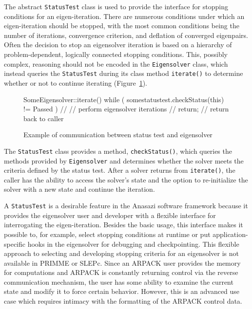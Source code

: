 \documentclass[acmtoms,acmnow]{acmtrans2m}
\newcommand{\aspace}[1]{\texttt{#1}}
\begin{document}
The abstract \aspace{StatusTest} class is used to provide the interface for stopping 
conditions for an eigen-iteration. There are numerous conditions under which an eigen-iteration 
should be stopped, with the most common conditions being the number of iterations,
convergence criterion, and deflation of converged eigenpairs.
Often the decision to stop an eigensolver iteration is based on a hierarchy 
of problem-dependent, logically connected stopping conditions.
This, possibly complex, reasoning should not be encoded in the \aspace{Eigensolver} class,
which instead queries the \aspace{StatusTest} during its class method \aspace{iterate()} to determine 
whether or not to continue iterating (Figure~\ref{fig:comm}).
\begin{figure}[htb]
\begin{center}
\begin{boxedverbatim}
SomeEigensolver::iterate() {
  while ( somestatustest.checkStatus(this) != Passed ) {
    //
    // perform eigensolver iterations
    //
  }
  return;  // return back to caller
}
\end{boxedverbatim}
\end{center}
\caption{Example of communication between status test and eigensolver}
\label{fig:comm}
\end{figure}
The \aspace{StatusTest} class provides a method, \verb!checkStatus()!, which queries the methods provided by
\aspace{Eigensolver} and determines whether the solver meets the criteria defined by the 
status test. After a solver returns from \verb!iterate()!, the caller has the ability to access the
solver's state and the option to re-initialize the solver with a new state and continue
the iteration.

A \aspace{StatusTest} is a desirable feature in the Anasazi software framework because it
provides the eigensolver user and developer with a flexible interface for interrogating
the eigen-iteration. Besides the basic usage, this interface makes it possible to, for
example, select stopping conditions at runtime or put application-specific hooks in the
eigensolver for debugging and checkpointing. This flexible approach to selecting and
developing stopping criteria for an eigensolver is not available in PRIMME or SLEPc.
Since an ARPACK user provides the memory for computations and ARPACK is constantly
returning control via the reverse communication mechanism, the user has some ability to
examine the current state and modify it to force certain behavior. However, this is an
advanced use case which requires intimacy with the formatting of the ARPACK control data.
\end{document}

